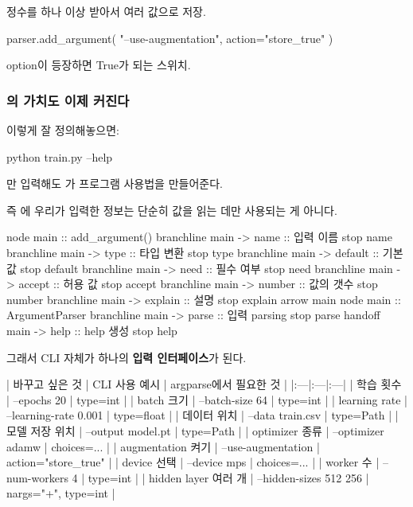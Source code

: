\begin{dhksmry}[centered]
정수를 하나 이상 받아서 여러 값으로 저장.
\end{dhksmry}

\begin{dhkcode}
parser.add_argument(
    "--use-augmentation",
    action="store_true"
)
\end{dhkcode}

\begin{dhksmry}[centered]
option이 등장하면 True가 되는 스위치.
\end{dhksmry}

\subsubsection{의 가치도 이제 커진다}

이렇게 잘 정의해놓으면:

\begin{dhkzsh}
python train.py --help
\end{dhkzsh}

만 입력해도 가 프로그램 사용법을 만들어준다.

즉 에 우리가 입력한 정보는 단순히 값을 읽는 데만 사용되는 게 아니다.

\begin{dhkbranch}[in=8]
node main :: add_argument()
branchline main -> name :: 입력 이름
stop name
branchline main -> type :: 타입 변환
stop type
branchline main -> default :: 기본값
stop default
branchline main -> need :: 필수 여부
stop need
branchline main -> accept :: 허용 값
stop accept
branchline main -> number :: 값의 갯수
stop number
branchline main -> explain :: 설명
stop explain
arrow main
node main :: ArgumentParser
branchline main -> parse :: 입력 parsing
stop parse
handoff main -> help :: help 생성
stop help
\end{dhkbranch}

그래서 CLI 자체가 하나의 \textbf{입력 인터페이스}가 된다.

\begin{dhktable}
| 바꾸고 싶은 것 | CLI 사용 예시 | argparse에서 필요한 것 |
|:---|:---|:---|
| 학습 횟수 | --epochs 20 | type=int |
| batch 크기 | --batch-size 64 | type=int |
| learning rate | --learning-rate 0.001 | type=float |
| 데이터 위치 | --data train.csv | type=Path |
| 모델 저장 위치 | --output model.pt | type=Path |
| optimizer 종류 | --optimizer adamw | choices=... |
| augmentation 켜기 | --use-augmentation | action="store_true" |
| device 선택 | --device mps | choices=... |
| worker 수 | --num-workers 4 | type=int |
| hidden layer 여러 개 | --hidden-sizes 512 256 | nargs="+", type=int |
\end{dhktable}
